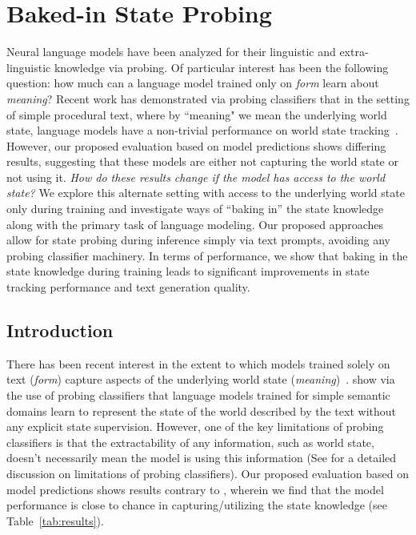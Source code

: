 \documentclass[12pt]{thesis-umich}[thesis]
\begin{document}
\section{Baked-in State Probing}
\label{sec:bake_state}
Neural language models have been analyzed for their linguistic and extra-linguistic knowledge via probing.  
Of particular interest has been the following question: how much can a language model trained only on \emph{form} learn about \emph{meaning}? 
Recent work has demonstrated via probing classifiers that in the setting of simple procedural text, where by ``meaning" we mean the underlying world state, language models have a non-trivial performance on world state tracking~\cite{li-etal-2021-implicit, toshniwal-etal-2022-chess}. 
However, our proposed evaluation based on model predictions shows differing results, suggesting that these models are either not capturing the world state or not using it.
\emph{How do these results change if the model has access to the world state?}
We explore this alternate setting with access to the underlying world state only during training and investigate ways of ``baking in'' the state knowledge along with the primary task of language modeling. 
Our proposed approaches allow for state probing during inference simply via text prompts, avoiding any probing classifier machinery.  
In terms of performance, we show that baking in the state knowledge during training leads to significant improvements in state tracking performance and text generation quality. 


\subsection{Introduction}
There has been recent interest in the extent to which models trained solely on text (\emph{form}) capture aspects of the underlying world state (\emph{meaning})~\cite{bender-koller-2020-climbing, bisk-etal-2020-experience, wu2021infusing, Bender2021OnTD, li-etal-2021-implicit,toshniwal-etal-2022-chess}. 
\citet{li-etal-2021-implicit} show via the use of probing classifiers that language models trained for simple semantic domains learn to represent the state of the world described by the text without any explicit state supervision. 
However, one of the key limitations of probing classifiers is that the extractability of any information, such as world state, doesn't necessarily mean the model is using this information (See \citet{belinkov2022probing} for a detailed discussion on limitations of probing classifiers). 
Our proposed evaluation based on model predictions shows results contrary to \citet{li-etal-2021-implicit}, wherein we find that the model performance is close to chance in capturing/utilizing the state knowledge (see Table~\ref{tab:results}).    
\end{document}
